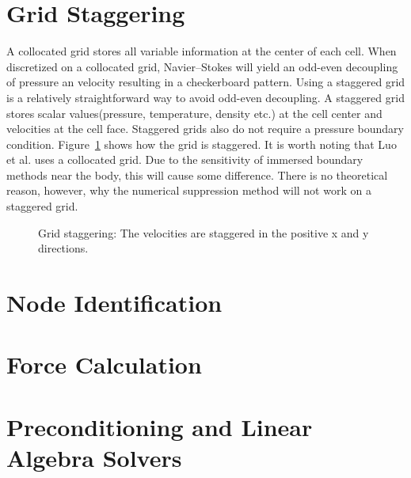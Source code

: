 \documentclass[onehalf,11pt]{beavtex}
\begin{document}
\section{Grid Staggering}
\label{Grid Staggering}

A collocated grid stores all variable information at the center of each cell.
When discretized on a collocated grid, Navier--Stokes will yield an odd-even decoupling of pressure an velocity resulting in a checkerboard pattern. 
Using a staggered grid is a relatively straightforward way to avoid odd-even decoupling.
A staggered grid stores scalar values(pressure, temperature, density etc.) at the cell center and velocities at the cell face. 
Staggered grids also do not require a pressure boundary condition.
Figure~\ref{fig:stagger} shows how the grid is staggered.
It is worth noting that Luo et al.\cite{Luo:2012gx} uses a collocated grid.
Due to the sensitivity of immersed boundary methods near the body, this will cause some difference.
There is no theoretical reason, however, why the numerical suppression method will not work on a staggered grid.
\begin{figure}[htb]
	\centering
	
	\caption{Grid staggering: The velocities are staggered in the positive x and y directions.}
	\label{fig:stagger}
\end{figure}

\section{Node Identification}

\section{Force Calculation}
\label{Force Calculation}

\section{Preconditioning and Linear Algebra Solvers}
\label{Preconditioning and Linear Algebra Solvers}
\end{document}
